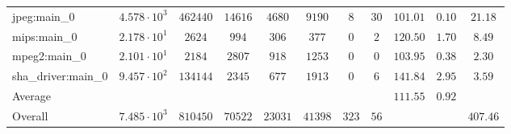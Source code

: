 \begin{tabular}{|l|c|c|c|c|c|c|c|c|c|c|}
jpeg:main\_0            & $ 4.578 \cdot 10^{3}  $ & $ 462440 $ & $ 14616 $ & $ 4680  $ & $ 9190  $ & $ 8   $ & $ 30 $ & $ 101.01      $ & $ 0.10    $ & $ 21.18   $ \\
mips:main\_0            & $ 2.178 \cdot 10^{1}  $ & $ 2624   $ & $ 994   $ & $ 306   $ & $ 377   $ & $ 0   $ & $ 2  $ & $ 120.50      $ & $ 1.70    $ & $ 8.49    $ \\
mpeg2:main\_0           & $ 2.101 \cdot 10^{1}  $ & $ 2184   $ & $ 2807  $ & $ 918   $ & $ 1253  $ & $ 0   $ & $ 0  $ & $ 103.95      $ & $ 0.38    $ & $ 2.30    $ \\
sha\_driver:main\_0     & $ 9.457 \cdot 10^{2}  $ & $ 134144 $ & $ 2345  $ & $ 677   $ & $ 1913  $ & $ 0   $ & $ 6  $ & $ 141.84      $ & $ 2.95    $ & $ 3.59    $ \\
\hline
Average                 & $                     $ & $        $ & $       $ & $       $ & $       $ & $     $ & $    $ & $ 111.55      $ & $ 0.92    $ & $         $ \\
\hline
Overall                 & $ 7.485 \cdot 10^{3}  $ & $ 810450 $ & $ 70522 $ & $ 23031 $ & $ 41398 $ & $ 323 $ & $ 56 $ & $             $ & $         $ & $ 407.46  $ \\
\hline
\end{tabular}
